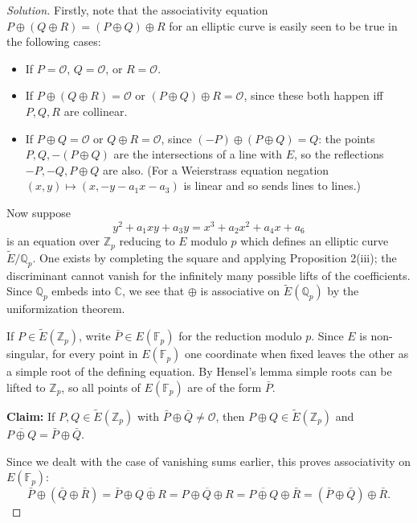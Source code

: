 \documentclass[a4paper]{article}
\theoremstyle{plain}
\theoremstyle{remark}
\theoremstyle{definition}
\renewcommand{\O}{\mathcal{O}}
\newcommand{\F}{\mathbb{F}}
\newcommand{\Z}{\mathbb{Z}}
\newcommand{\Q}{\mathbb{Q}}
\newcommand{\C}{\mathbb{C}}
\begin{document}
\begin{enumerate}
        \begin{proof}[Solution]
            Firstly, note that the associativity equation
            $P\oplus(Q\oplus R)=(P\oplus Q)\oplus R$ for an elliptic curve is
            easily seen to be true in the following cases:
            \begin{itemize}
                \item If $P=\O$, $Q=\O$, or $R=\O$.
                \item If $P\oplus(Q\oplus R)=\O$ or $(P\oplus Q)\oplus R=\O$,
                    since these both happen iff $P,Q,R$ are collinear.
                \item If $P\oplus Q=\O$ or $Q\oplus R=\O$, since
                    $(-P)\oplus(P\oplus Q)=Q$: the points $P,Q,-(P\oplus Q)$ are
                    the intersections of a line with $E$, so the reflections
                    $-P,-Q,P\oplus Q$ are also. (For a Weierstrass equation
                    negation $(x,y)\mapsto(x,-y-a_1x-a_3)$ is linear and so
                    sends lines to lines.)
            \end{itemize}
            Now suppose
            \begin{equation*}
                y^2 + a_1xy + a_3y = x^3 + a_2x^2 + a_4x + a_6
            \end{equation*}
            is an equation over $\Z_p$ reducing to $E$ modulo $p$ which defines
            an elliptic curve $\tilde E/\Q_p$. One exists by completing the
            square and applying Proposition 2(iii); the discriminant cannot
            vanish for the infinitely many possible lifts of the coefficients.
            Since $\Q_p$ embeds into $\C$, we see that $\oplus$ is associative
            on $\tilde E(\Q_p)$ by the uniformization theorem.

            If $P\in\tilde E(\Z_p)$, write $\bar P\in E(\F_p)$ for the reduction
            modulo $p$. Since $E$ is non-singular, for every point in $E(\F_p)$
            one coordinate when fixed leaves the other as a simple root of the
            defining equation. By Hensel's lemma simple roots can be lifted to
            $\Z_p$, so all points of $E(\F_p)$ are of the form $\bar P$.

            \textbf{Claim:} If $P,Q\in\tilde E(\Z_p)$ with
            $\bar P\oplus\bar Q\ne\O$, then $P\oplus Q\in\tilde E(\Z_p)$ and
            $\overline{P\oplus Q}=\bar P\oplus\bar Q$.

            Since we dealt with the case of vanishing sums earlier, this proves
            associativity on $E(\F_p)$:
            \begin{equation*}
                \bar P\oplus(\bar Q\oplus\bar R)
                    = \bar P\oplus\overline{Q\oplus R}
                    = \overline{P\oplus Q\oplus R}
                    = \overline{P\oplus Q}\oplus\bar R
                    = (\bar P\oplus\bar Q)\oplus\bar R.
            \end{equation*}


\end{proof}
\end{enumerate}
\end{document}
